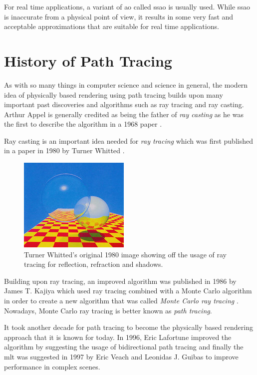 \documentclass[
  twoside,
  11pt, a4paper,
  footinclude=true,
  headinclude=true,
  cleardoublepage=empty
]{scrreprt}
\begin{document}
For real time applications, a variant of \ac{ao} called \acf{ssao} is usually used. While \ac{ssao}
is inaccurate from a physical point of view, it results in some very fast and acceptable
approximations that are suitable for real time applications.

\section{History of Path Tracing}
As with so many things in computer science and science in general, the modern idea of physically
based rendering using path tracing builds upon many important past discoveries and algorithms
such as ray tracing and ray casting.
Arthur Appel is generally credited as being the father of
\emph{ray casting} as he was the first to describe the algorithm in a 1968 paper
\cite{inproceedings:raycasting}.

Ray casting is an important idea needed for \emph{ray tracing} which was
first published in a paper in 1980 by Turner Whitted \cite{article:raytracing}.

\begin{figure}[h]
    \includegraphics{early-raytracing-whitted}
    \centering
    \caption{Turner Whitted's original 1980 \cite{article:raytracing} image showing off the usage of ray tracing for
    reflection, refraction and shadows.}
    \label{fig:early-raytracing-whitted}
\end{figure}
Building upon ray tracing, an improved algorithm was published in 1986 by James T. Kajiya which used ray tracing
combined with a Monte Carlo algorithm in order to create a new algorithm that was called \emph{Monte
Carlo ray tracing} \cite{inproceedings:pathtracing}. Nowadays, Monte Carlo ray tracing is better
known as \emph{path tracing}.

It took another decade for path tracing to become the
physically based rendering approach that it is known for today. In 1996, Eric Lafortune improved
the algorithm by suggesting the usage of bidirectional path tracing \cite{techreport:pbr} and
finally the \ac{mlt} was suggested in 1997 by Eric Veach and Leonidas J. Guibas \cite{inproceedings:metropolis} to
improve performance in complex scenes.
\end{document}
